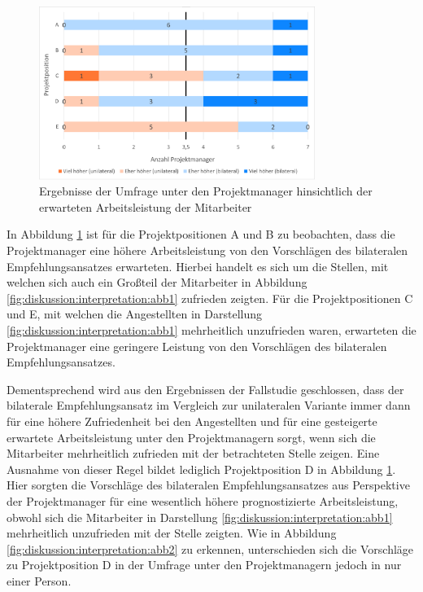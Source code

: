 \begin{figure}[h]
	\centering
	\includegraphics[width=0.8\textwidth]{gfx/ergebnisse-projektmanager-arbeitsleistung.png}	
	\caption{Ergebnisse der Umfrage unter den Projektmanager hinsichtlich der erwarteten Arbeitsleistung der Mitarbeiter}
	\label{fig:diskussion:interpretation:abb4}
\end{figure}

In Abbildung \ref{fig:diskussion:interpretation:abb4} ist für die Projektpositionen A und B zu beobachten, dass die Projektmanager eine höhere Arbeitsleistung von den Vorschlägen des bilateralen Empfehlungsansatzes erwarteten. Hierbei handelt es sich um die Stellen, mit welchen sich auch ein Großteil der Mitarbeiter in Abbildung \ref{fig:diskussion:interpretation:abb1} zufrieden zeigten. Für die Projektpositionen C und E, mit welchen die Angestellten in Darstellung \ref{fig:diskussion:interpretation:abb1} mehrheitlich unzufrieden waren, erwarteten die Projektmanager eine geringere Leistung von den Vorschlägen des bilateralen Empfehlungsansatzes.

Dementsprechend wird aus den Ergebnissen der Fallstudie geschlossen, dass der bilaterale Empfehlungsansatz im Vergleich zur unilateralen Variante immer dann für eine höhere Zufriedenheit bei den Angestellten und für eine gesteigerte erwartete Arbeitsleistung unter den Projektmanagern sorgt, wenn sich die Mitarbeiter mehrheitlich zufrieden mit der betrachteten Stelle zeigen. Eine Ausnahme von dieser Regel bildet lediglich Projektposition D in Abbildung \ref{fig:diskussion:interpretation:abb4}. Hier sorgten die Vorschläge des bilateralen Empfehlungsansatzes aus Perspektive der Projektmanager für eine wesentlich höhere prognostizierte Arbeitsleistung, obwohl sich die Mitarbeiter in Darstellung \ref{fig:diskussion:interpretation:abb1} mehrheitlich unzufrieden mit der Stelle zeigten. Wie in Abbildung \ref{fig:diskussion:interpretation:abb2} zu erkennen, unterschieden sich die Vorschläge zu Projektposition D in der Umfrage unter den Projektmanagern jedoch in nur einer Person.

